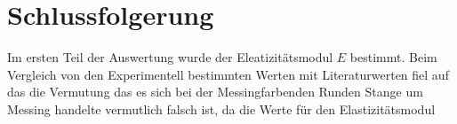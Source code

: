 
\section{Schlussfolgerung}
Im ersten Teil der Auswertung wurde der Eleatizitätsmodul $E$ bestimmt. Beim Vergleich von den Experimentell bestimmten Werten mit Literaturwerten fiel auf das die Vermutung das es sich bei der Messingfarbenden Runden Stange um Messing handelte vermutlich falsch ist, da die Werte für den Elastizitätsmodul 











